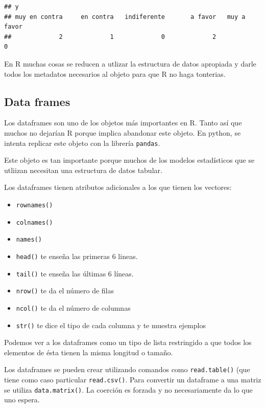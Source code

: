 \documentclass[]{article}
\providecommand{\tightlist}{%
  \setlength{\itemsep}{0pt}\setlength{\parskip}{0pt}}
\begin{document}
\begin{verbatim}
## y
## muy en contra     en contra   indiferente       a favor   muy a favor 
##             2             1             0             2             0
\end{verbatim}

\begin{nota}[Nota]
En R muchas cosas se reducen a utlizar la estructura de datos apropiada y darle
todos los metadatos necesarios al objeto para que R no haga tonterias.
\end{nota}

\subsection{Data frames}\label{data-frames}

Los dataframes son uno de los objetos más importantes en R. Tanto así
que muchos no dejarían R porque implica abandonar este objeto. En
python, se intenta replicar este objeto con la librería \texttt{pandas}.

Este objeto es tan importante porque muchos de los modelos estadísticos
que se utliizan necesitan una estructura de datos tabular.

Los dataframes tienen atributos adicionales a los que tienen los
vectores:

\begin{itemize}
\tightlist
\item
  \texttt{rownames()}
\item
  \texttt{colnames()}
\item
  \texttt{names()}
\item
  \texttt{head()} te enseña las primeras 6 lineas.
\item
  \texttt{tail()} te enseña las últimas 6 líneas.
\item
  \texttt{nrow()} te da el número de filas
\item
  \texttt{ncol()} te da el número de columnas
\item
  \texttt{str()} te dice el tipo de cada columna y te muestra ejemplos
\end{itemize}

Podemos ver a los dataframes como un tipo de lista restringido a que
todos los elementos de ésta tienen la misma longitud o tamaño.

Los dataframes se pueden crear utilizando comandos como
\texttt{read.table()} (que tiene como caso particular
\texttt{read.csv()}. Para convertir un dataframe a una matriz se utiliza
\texttt{data.matrix()}. La coerción es forzada y no necesariamente da lo
que uno espera.
\end{document}
